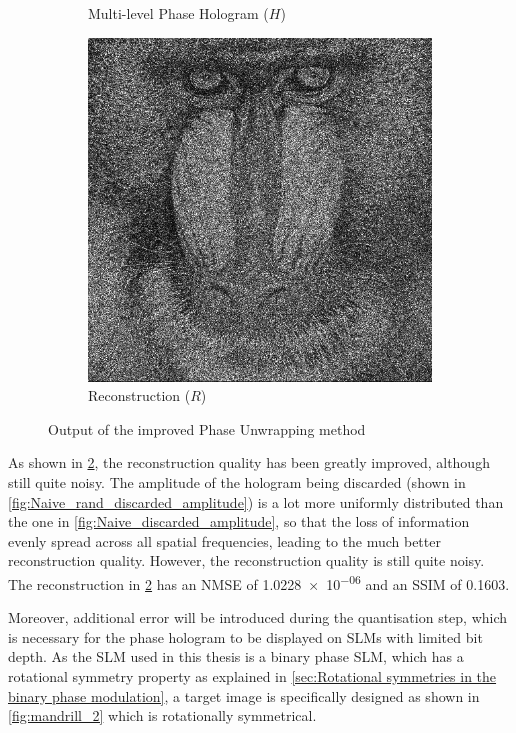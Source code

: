 \begin{figure}[H]
\begin{subfigure}[t]{0.3\textwidth}
    \caption{Multi-level Phase Hologram ($H$)}
    \label{fig:Naive_rand_holo}
  \end{subfigure}
  \hfill
  \begin{subfigure}[t]{0.3\textwidth}
    \centering
    \includegraphics[width=\textwidth]{Naive_rand_recon.png}
    \caption{Reconstruction ($R$)}
    \label{fig:Naive_rand_recon}
  \end{subfigure}
  \caption{Output of the improved Phase Unwrapping method}
  \label{fig:Output of the improved Naive method}
\end{figure}

As shown in \cref{fig:Naive_rand_recon}, the reconstruction quality has been greatly improved, although still quite noisy. The amplitude of the hologram being discarded (shown in \cref{fig:Naive_rand_discarded_amplitude}) is a lot more uniformly distributed than the one in \cref{fig:Naive_discarded_amplitude}, so that the loss of information evenly spread across all spatial frequencies, leading to the much better reconstruction quality. However, the reconstruction quality is still quite noisy. The reconstruction in \cref{fig:Naive_rand_recon} has an NMSE of \num{1.0228e-06} and an SSIM of 0.1603.

Moreover, additional error will be introduced during the quantisation step, which is necessary for the phase hologram to be displayed on SLMs with limited bit depth. As the SLM used in this thesis is a binary phase SLM, which has a rotational symmetry property as explained in \cref{sec:Rotational symmetries in the binary phase modulation}, a target image is specifically designed as shown in \cref{fig:mandrill_2} which is rotationally symmetrical.


